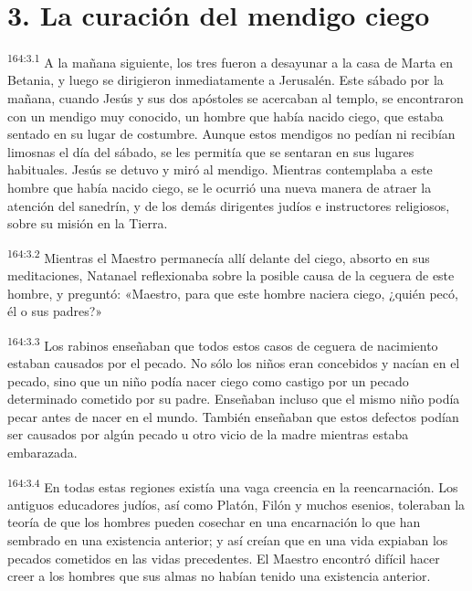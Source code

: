 \section*{3. La curación del mendigo ciego}
\par 
\textsuperscript{164:3.1} A la mañana siguiente, los tres fueron a desayunar a la casa de Marta en Betania, y luego se dirigieron inmediatamente a Jerusalén. Este sábado por la mañana, cuando Jesús y sus dos apóstoles se acercaban al templo, se encontraron con un mendigo muy conocido, un hombre que había nacido ciego, que estaba sentado en su lugar de costumbre. Aunque estos mendigos no pedían ni recibían limosnas el día del sábado, se les permitía que se sentaran en sus lugares habituales. Jesús se detuvo y miró al mendigo. Mientras contemplaba a este hombre que había nacido ciego, se le ocurrió una nueva manera de atraer la atención del sanedrín, y de los demás dirigentes judíos e instructores religiosos, sobre su misión en la Tierra.

\par 
\textsuperscript{164:3.2} Mientras el Maestro permanecía allí delante del ciego, absorto en sus meditaciones, Natanael reflexionaba sobre la posible causa de la ceguera de este hombre, y preguntó: «Maestro, para que este hombre naciera ciego, ¿quién pecó, él o sus padres?»

\par 
\textsuperscript{164:3.3} Los rabinos enseñaban que todos estos casos de ceguera de nacimiento estaban causados por el pecado. No sólo los niños eran concebidos y nacían en el pecado, sino que un niño podía nacer ciego como castigo por un pecado determinado cometido por su padre. Enseñaban incluso que el mismo niño podía pecar antes de nacer en el mundo. También enseñaban que estos defectos podían ser causados por algún pecado u otro vicio de la madre mientras estaba embarazada.

\par 
\textsuperscript{164:3.4} En todas estas regiones existía una vaga creencia en la reencarnación. Los antiguos educadores judíos, así como Platón, Filón y muchos esenios, toleraban la teoría de que los hombres pueden cosechar en una encarnación lo que han sembrado en una existencia anterior; y así creían que en una vida expiaban los pecados cometidos en las vidas precedentes. El Maestro encontró difícil hacer creer a los hombres que sus almas no habían tenido una existencia anterior.

